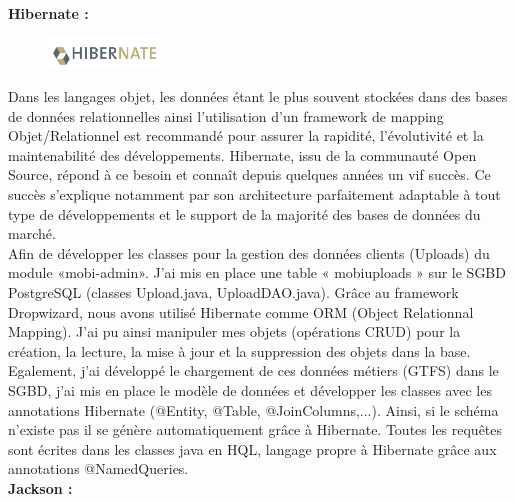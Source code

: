 \begin{itemize}
\\

\textbf{Hibernate :}

\begin{figure}
\centering
\includegraphics[width=3cm]{images/hibernate.png}
\end{figure}
\noindent Dans les langages objet, les données étant le plus souvent stockées dans des bases de données relationnelles ainsi l'utilisation d'un framework de mapping Objet/Relationnel est recommandé pour assurer la rapidité, l'évolutivité et la maintenabilité des développements. Hibernate, issu de la communauté Open Source, répond à ce besoin et connaît depuis quelques années un vif succès. Ce succès s'explique notamment par son architecture parfaitement adaptable à tout type de développements et le support de la majorité des bases de données du marché.\\

Afin de développer les classes pour la gestion des données clients (Uploads) du module «mobi-admin». J'ai mis en place une table « mobiuploads » sur le SGBD PostgreSQL (classes Upload.java, UploadDAO.java).
Grâce au framework Dropwizard, nous avons utilisé Hibernate comme ORM (Object Relationnal Mapping). J'ai pu ainsi manipuler mes objets (opérations CRUD) pour la création, la lecture, la mise à jour et la suppression des objets dans la base. 
Egalement, j'ai développé le chargement de ces données métiers (GTFS) dans le SGBD, j'ai mis en place le modèle de données et développer les classes avec les annotations Hibernate (@Entity, @Table, @JoinColumns,...). Ainsi, si le schéma n'existe pas il se génère automatiquement grâce à Hibernate. 
Toutes les requêtes sont écrites dans les classes java en HQL, langage propre à Hibernate grâce aux annotations @NamedQueries. \\


\textbf{Jackson :}


\end{itemize}
